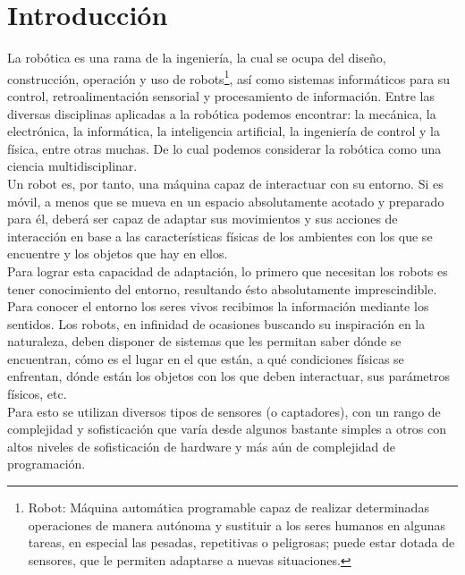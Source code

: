 

\newpage

\chapter{Introducción}
\label{chap:introducción}

La robótica es una rama de la ingeniería, la cual se ocupa del diseño, construcción, operación y uso de robots\footnote{Robot: Máquina automática programable capaz de 
realizar determinadas operaciones de manera autónoma y sustituir a los seres humanos en algunas tareas, en especial las pesadas, repetitivas o peligrosas; puede estar dotada de sensores, 
que le permiten adaptarse a nuevas situaciones.}, así como sistemas informáticos para su control, retroalimentación sensorial y procesamiento de información. Entre las diversas
disciplinas aplicadas a la robótica podemos encontrar: la mecánica, la electrónica, la informática, la inteligencia artificial, la ingeniería de control y la física, entre otras muchas. De lo cual podemos considerar 
la robótica como una ciencia multidisciplinar.\\

Un robot es, por tanto, una máquina capaz de interactuar con su entorno. Si es móvil, a menos que se mueva en un espacio absolutamente acotado y preparado para él, deberá ser
capaz de adaptar sus movimientos y sus acciones de interacción en base a las características físicas de los ambientes con los que se encuentre y los objetos que hay en ellos.\\

Para lograr esta capacidad de adaptación, lo primero que necesitan los robots es tener conocimiento del entorno, resultando ésto absolutamente imprescindible. Para conocer el
entorno los seres vivos recibimos la información mediante los sentidos. Los robots, en infinidad de ocasiones buscando su inspiración en la naturaleza, deben disponer de sistemas que
les permitan saber dónde se encuentran, cómo es el lugar en el que están, a qué condiciones físicas se enfrentan, dónde están los objetos con los que deben interactuar,
sus parámetros físicos, etc.\\

Para esto se utilizan diversos tipos de sensores (o captadores), con un rango de complejidad y sofisticación que varía desde algunos bastante simples a otros con altos niveles de 
sofisticación de hardware y más aún de complejidad de programación.\\

